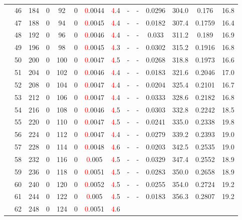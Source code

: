 \begin{table}[htb]
{\begin{tabular}{|c|c|c|c|c|c|c|c|c|c|c|c|c|c|}
 & 
46 & 184 & 0 & 92 & 0
 & \textcolor{red}0.0044 & \textcolor{red}4.4
 & - & -
 & 0.0296 & 304.0
 & 0.176 & 16.8
 \\
 & 
47 & 188 & 0 & 94 & 0
 & \textcolor{red}0.0045 & \textcolor{red}4.4
 & - & -
 & 0.0182 & 307.4
 & 0.1759 & 16.4
 \\
 & 
48 & 192 & 0 & 96 & 0
 & \textcolor{red}0.0046 & \textcolor{red}4.4
 & - & -
 & 0.033 & 311.2
 & 0.189 & 16.9
 \\
 & 
49 & 196 & 0 & 98 & 0
 & \textcolor{red}0.0045 & \textcolor{red}4.3
 & - & -
 & 0.0302 & 315.2
 & 0.1916 & 16.8
 \\
 & 
50 & 200 & 0 & 100 & 0
 & \textcolor{red}0.0047 & \textcolor{red}4.5
 & - & -
 & 0.0268 & 318.8
 & 0.1973 & 16.6
 \\
 & 
51 & 204 & 0 & 102 & 0
 & \textcolor{red}0.0046 & \textcolor{red}4.4
 & - & -
 & 0.0183 & 321.6
 & 0.2046 & 17.0
 \\
 & 
52 & 208 & 0 & 104 & 0
 & \textcolor{red}0.0047 & \textcolor{red}4.4
 & - & -
 & 0.0204 & 325.4
 & 0.2101 & 16.7
 \\
 & 
53 & 212 & 0 & 106 & 0
 & \textcolor{red}0.0047 & \textcolor{red}4.4
 & - & -
 & 0.0333 & 328.6
 & 0.2182 & 16.8
 \\
 & 
54 & 216 & 0 & 108 & 0
 & \textcolor{red}0.0046 & \textcolor{red}4.5
 & - & -
 & 0.0303 & 332.8
 & 0.2242 & 18.5
 \\
 & 
55 & 220 & 0 & 110 & 0
 & \textcolor{red}0.0047 & \textcolor{red}4.5
 & - & -
 & 0.0241 & 335.0
 & 0.2338 & 19.8
 \\
 & 
56 & 224 & 0 & 112 & 0
 & \textcolor{red}0.0047 & \textcolor{red}4.4
 & - & -
 & 0.0279 & 339.2
 & 0.2393 & 19.0
 \\
 & 
57 & 228 & 0 & 114 & 0
 & \textcolor{red}0.0048 & \textcolor{red}4.6
 & - & -
 & 0.0203 & 342.5
 & 0.2535 & 19.0
 \\
 & 
58 & 232 & 0 & 116 & 0
 & \textcolor{red}0.005 & \textcolor{red}4.5
 & - & -
 & 0.0329 & 347.4
 & 0.2552 & 18.9
 \\
 & 
59 & 236 & 0 & 118 & 0
 & \textcolor{red}0.0051 & \textcolor{red}4.5
 & - & -
 & 0.0283 & 350.0
 & 0.2658 & 18.9
 \\
 & 
60 & 240 & 0 & 120 & 0
 & \textcolor{red}0.0052 & \textcolor{red}4.5
 & - & -
 & 0.0255 & 354.0
 & 0.2724 & 19.2
 \\
 & 
61 & 244 & 0 & 122 & 0
 & \textcolor{red}0.005 & \textcolor{red}4.5
 & - & -
 & 0.0183 & 356.3
 & 0.2807 & 19.2
 \\
 & 
62 & 248 & 0 & 124 & 0
 & \textcolor{red}0.0051 & \textcolor{red}4.6

\end{tabular}}
\end{table}
